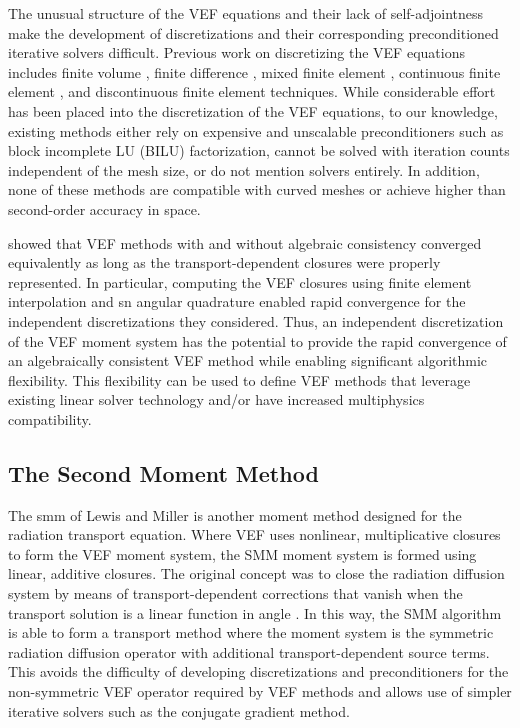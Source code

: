 \documentclass[../doc.tex]{subfiles}
\begin{document}
The unusual structure of the VEF equations and their lack of self-adjointness make the development of discretizations and their corresponding preconditioned iterative solvers difficult.
Previous work on discretizing the VEF equations includes finite volume \cite{anistratov_fvm,doi:10.1080/00411459308203810,QDBC,Jiang_2012,Jones2019TheQM}, finite difference \cite{WIESELQUIST2014343}, mixed finite element \cite{vallette,me,olivier_mandc,LOU2019258,LOU2021110393}, continuous finite element \cite{wieselquist,two-level-independent-warsa}, and discontinuous finite element \cite{dima_dfem} techniques. 
While considerable effort has been placed into the discretization of the VEF equations, to our knowledge, existing methods either rely on expensive and unscalable preconditioners such as block incomplete LU (BILU) factorization, cannot be solved with iteration counts independent of the mesh size, or do not mention solvers entirely. In addition, none of these methods are compatible with curved meshes or achieve higher than second-order accuracy in space. 

\textcite{two-level-independent-warsa} showed that VEF methods with and without algebraic consistency converged equivalently as long as the transport-dependent closures were properly represented. In particular, computing the VEF closures using finite element interpolation and \gls{sn} angular quadrature enabled rapid convergence for the independent discretizations they considered. 
Thus, an independent discretization of the VEF moment system has the potential to provide the rapid convergence of an algebraically consistent VEF method while enabling significant algorithmic flexibility. This flexibility can be used to define VEF methods that leverage existing linear solver technology and/or have increased multiphysics compatibility. 

\subsection{The Second Moment Method}
The \gls{smm} of Lewis and Miller \cite{lewis_miller} is another moment method designed for the radiation transport equation. Where VEF uses nonlinear, multiplicative closures to form the VEF moment system, the SMM moment system is formed using linear, additive closures. The original concept was to close the radiation diffusion system by means of transport-dependent corrections that vanish when the transport solution is a linear function in angle \cite{AL}. 
In this way, the SMM algorithm is able to form a transport method where the moment system is the symmetric radiation diffusion operator with additional transport-dependent source terms. This avoids the difficulty of developing discretizations and preconditioners for the non-symmetric VEF operator required by VEF methods and allows use of simpler iterative solvers such as the conjugate gradient method. 
\end{document}
